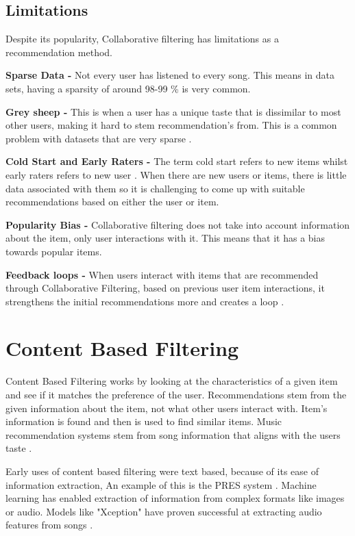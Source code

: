 \subsection{Limitations}
Despite its popularity, Collaborative filtering has limitations as a recommendation method.

\textbf{Sparse Data - }Not every user has listened to every song. This means in data sets, having a sparsity of around 98-99 \% is very common.

\textbf{Grey sheep - }This is when a user has a unique taste that is dissimilar to most other users, making it hard to stem recommendation's from. This is a common problem with datasets that are very sparse \citep{claypool_combining_1999}.

\textbf{Cold Start and Early Raters - } The term cold start refers to new items whilst early raters refers to new user \citep{avery_recommender_1997}. When there are new users or items, there is little data associated with them so it is challenging to come up with suitable recommendations based on either the user or item. 

\textbf{Popularity Bias - } Collaborative filtering does not take into account information about the item, only user interactions with it. This means that it has a bias towards popular items.

\textbf{Feedback loops - } When users interact with items that are recommended through Collaborative Filtering, based on previous user item interactions, it strengthens the initial recommendations more and creates a loop \citep{sanchez-moreno_incorporating_2018}.

\section{Content Based Filtering}

Content Based Filtering works by looking at the characteristics of a given item and see if it matches the preference of the user. Recommendations stem from the given information about the item, not what other users interact with. Item's information is found and then is used to find similar items\citep{casey_content-based_2008}. Music recommendation systems stem from song information that aligns with the users taste \citep{aucouturier_music_2002} \citep{logan_music_2004}. 

Early uses of content based filtering were text based, because of its ease of information extraction, An example of this is the PRES system \citep{van_meteren_using_2000}. Machine learning has enabled extraction of information from complex formats like images or audio. Models like "Xception" have proven successful at extracting audio features from songs \citep{chollet_xception_2017} \citep{singh_robustness_2022}.

